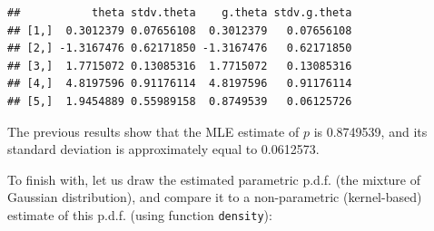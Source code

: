 \documentclass[
  12pt,
]{book}
\theoremstyle{definition}
\theoremstyle{definition}
\theoremstyle{definition}
\theoremstyle{definition}
\theoremstyle{remark}
\begin{document}
\begin{verbatim}
##           theta stdv.theta    g.theta stdv.g.theta
## [1,]  0.3012379 0.07656108  0.3012379   0.07656108
## [2,] -1.3167476 0.62171850 -1.3167476   0.62171850
## [3,]  1.7715072 0.13085316  1.7715072   0.13085316
## [4,]  4.8197596 0.91176114  4.8197596   0.91176114
## [5,]  1.9454889 0.55989158  0.8749539   0.06125726
\end{verbatim}

The previous results show that the MLE estimate of \(p\) is 0.8749539, and its standard deviation is approximately equal to 0.0612573.

To finish with, let us draw the estimated parametric p.d.f. (the mixture of Gaussian distribution), and compare it to a non-parametric (kernel-based) estimate of this p.d.f. (using function \texttt{density}):
\end{document}
